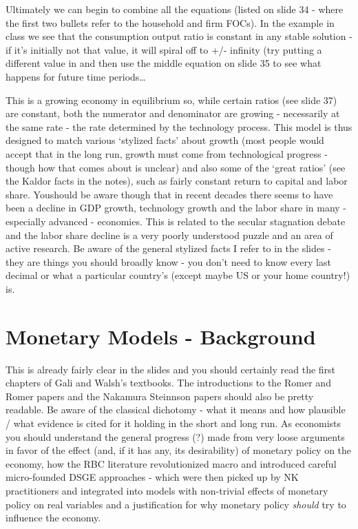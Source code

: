 \documentclass[authoryear,11pt]{elsarticle}
\begin{document}
Ultimately we can begin to combine all the equations (listed on slide 34 - where the first two bullets refer to the household and firm FOCs). In the example in class we see that the consumption output ratio is constant in any stable solution - if it's initially not that value, it will spiral off to +/- infinity (try putting a different value in and then use the middle equation on slide 35 to see what happens for future time periods\ldots

This is a growing economy in equilibrium so, while certain ratios (see slide 37) are constant, both the numerator and denominator are growing - necessarily at the same rate - the rate determined by the technology process. This model is thus designed to match various `stylized facts' about growth (most people would accept that in the long run, growth must come from technological progress - though how that comes about is unclear) and also some of the `great ratios' (see the Kaldor facts in the notes), such as fairly constant return to capital and labor share. Youshould be aware though that in recent decades there seems to have been a decline in GDP growth, technology growth and the labor share in many - especially advanced - economies. This is related to the secular stagnation debate and the labor share decline is a very poorly understood puzzle and an area of active research. Be aware of the general stylized facts I refer to in the slides - they are things you should broadly know - you don't need to know every last decimal or what a particular country's (except maybe US or your home country!) is.

\section{Monetary Models - Background}
This is already fairly clear in the slides and you should certainly read the first chapters of Gali and Walsh's textbooks. The introductions to the Romer and Romer papers and the Nakamura Steinnson papers should also be pretty readable. Be aware of the classical dichotomy - what it means and how plausible / what evidence is cited for it holding in the short and long run. As economists you should understand the general progress (?) made from very loose arguments in favor of the effect (and, if it has any, its desirability) of monetary policy on the economy, how the RBC literature revolutionized macro and introduced careful micro-founded DSGE approaches - which were then picked up by NK practitioners and integrated into models with non-trivial effects of monetary policy on real variables and a justification for why monetary policy \textit{should} try to influence the economy.
\end{document}
